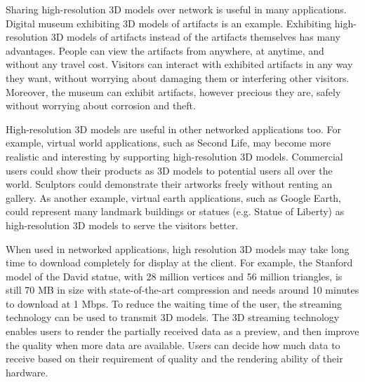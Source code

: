 \documentclass[11pt, a4paper]{report}
\begin{document}
    Sharing high-resolution 3D models over network is useful in many
    applications. Digital museum exhibiting 3D models of artifacts
    is an example. 
    Exhibiting high-resolution 3D models of artifacts instead of the
    artifacts themselves has many advantages. 
    People can view the artifacts from
    anywhere, at anytime, and without any travel cost. 
    Visitors can interact with exhibited artifacts
    in any way they want, without worrying about damaging them 
    or interfering other visitors. 
    Moreover, the museum can exhibit artifacts, however precious they are, 
    safely without worrying about corrosion and theft.

    High-resolution 3D models are useful in other networked applications too. 
    For example, virtual world applications,
    such as Second Life, may become more realistic and interesting by
    supporting high-resolution 3D models. 
    Commercial users could show their products as 3D models to potential users all over 
    the world. Sculptors could demonstrate their artworks freely without renting an gallery.
    As another example, virtual earth applications, 
    such as Google Earth, could represent many landmark buildings or statues
    (e.g. Statue of Liberty) as high-resolution 3D models to serve
    the visitors better.

    When used in networked applications, 
    high resolution 3D models may take long time to download completely
    for display at the client. 
    For example, the Stanford model of the David statue, with 28 million vertices and
    56 million triangles, is still 70 MB in size with
    state-of-the-art compression \cite{alliez2001progressive} and needs around 10 minutes
    to download at 1 Mbps.  
    To reduce the waiting time of the user, 
    the streaming technology can be used to transmit 3D models. 
    The 3D streaming technology enables users to render the partially received data as a preview, 
    and then improve the quality when more data are available. 
    Users can decide how much data to receive based on their requirement of quality
    and the rendering ability of their hardware.
\end{document}
